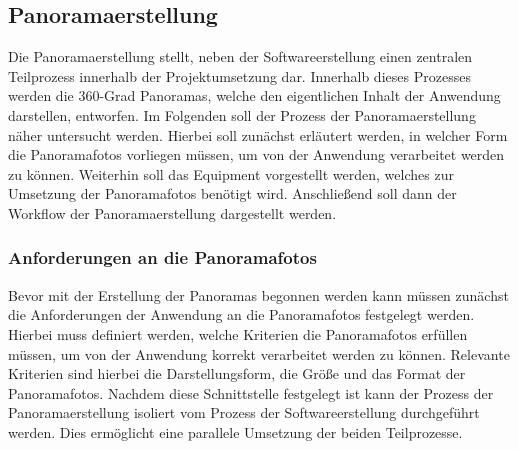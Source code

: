 \subsection{Panoramaerstellung}
\label{sec:Panoramaerstellung}

Die Panoramaerstellung stellt, neben der Softwareerstellung einen zentralen
Teilprozess innerhalb der Projektumsetzung dar. Innerhalb dieses Prozesses
werden die 360-Grad Panoramas, welche den eigentlichen Inhalt der Anwendung
darstellen, entworfen. Im Folgenden soll der Prozess der Panoramaerstellung
näher untersucht werden. Hierbei soll zunächst erläutert werden, in welcher
Form die Panoramafotos vorliegen müssen, um von der Anwendung verarbeitet
werden zu können. Weiterhin soll das Equipment vorgestellt werden, welches zur
Umsetzung der Panoramafotos benötigt wird. Anschließend soll dann der Workflow
der Panoramaerstellung dargestellt werden.

\subsubsection{Anforderungen an die Panoramafotos}
\label{sec:PanoramaerstellungAnforderungen}

Bevor mit der Erstellung der Panoramas begonnen werden kann müssen zunächst die
Anforderungen der Anwendung an die Panoramafotos festgelegt werden. Hierbei muss
definiert werden, welche Kriterien die Panoramafotos erfüllen müssen, um von der
Anwendung korrekt verarbeitet werden zu können. Relevante Kriterien sind hierbei
die Darstellungsform, die Größe und das Format der Panoramafotos. Nachdem diese
Schnittstelle festgelegt ist kann der Prozess der Panoramaerstellung isoliert
vom Prozess der Softwareerstellung durchgeführt werden. Dies ermöglicht eine
parallele Umsetzung der beiden Teilprozesse.

